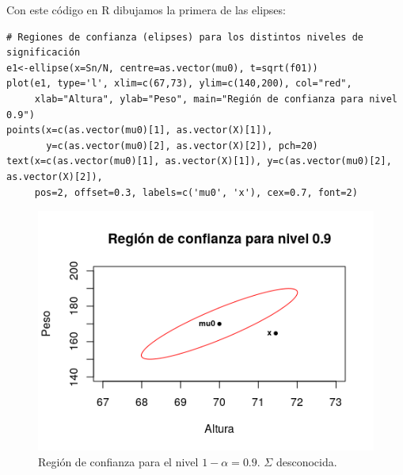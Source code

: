 \documentclass[12pt]{article}
\begin{document}
Con este código en R dibujamos la primera de las elipses:
\begin{verbatim}
# Regiones de confianza (elipses) para los distintos niveles de significación
e1<-ellipse(x=Sn/N, centre=as.vector(mu0), t=sqrt(f01))
plot(e1, type='l', xlim=c(67,73), ylim=c(140,200), col="red",
     xlab="Altura", ylab="Peso", main="Región de confianza para nivel 0.9")
points(x=c(as.vector(mu0)[1], as.vector(X)[1]),
       y=c(as.vector(mu0)[2], as.vector(X)[2]), pch=20)
text(x=c(as.vector(mu0)[1], as.vector(X)[1]), y=c(as.vector(mu0)[2], as.vector(X)[2]),
     pos=2, offset=0.3, labels=c('mu0', 'x'), cex=0.7, font=2)
\end{verbatim}

\vspace{-4mm}
\begin{figure}[H]
  \centering
  \includegraphics[width=120mm]{elipses/desc-01}
  \caption{Región de confianza para el nivel $1-\alpha=0.9$. $\Sigma$ desconocida.}
  \label{fig:desc-01}
\end{figure}
\end{document}
